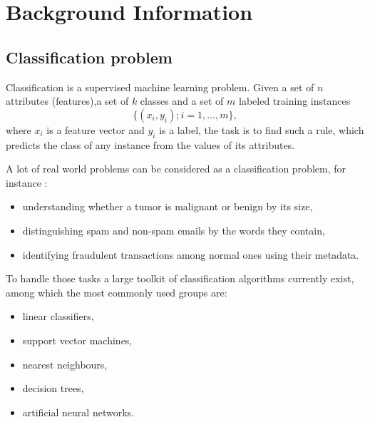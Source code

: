 \chapter{Background Information}
\label{ch:background-information}



\section{Classification problem}
Classification is a supervised machine learning problem. Given a set of $n$ attributes (features),a set of $k$ classes and a set of $m$ labeled training instances $$\{(x_i,y_i);i=1,...,m\},$$ where $x_i$ is a feature vector and $y_i$  is a label, the task is to find such a rule, which predicts the class of any instance from the values of its attributes.

A lot of real world problems can be considered as a classification problem, for instance \citep{Ng-2012cs229}:
\begin{itemize}
    \item understanding whether a tumor is malignant or benign by its size,
    \item distinguishing spam and non-spam emails by the words they contain,
    \item identifying fraudulent transactions among normal ones using their metadata.
\end{itemize}
To handle those tasks a large toolkit of classification algorithms currently exist, among which the most commonly used groups are: 
\begin{itemize}
 \item linear classifiers,
 \item support vector machines,
 \item nearest neighbours,
 \item decision trees,
 \item artificial neural networks.
\end{itemize} 

